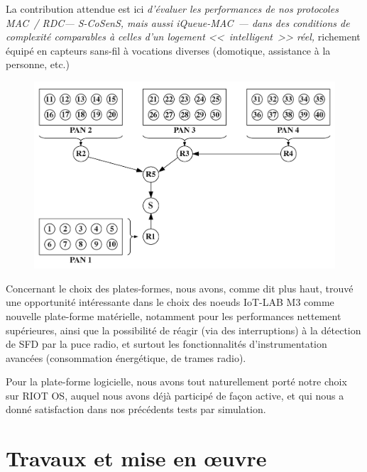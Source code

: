 \begin{enumerate}
La contribution attendue est ici \emph{d'évaluer les performances de nos
protocoles MAC~/ RDC--- S-CoSenS, mais aussi iQueue-MAC~--- dans des
conditions de complexité comparables à celles d'un logement <<~intelligent~>>
réel,} richement équipé en capteurs sans-fil à vocations diverses (domotique,
assistance à la personne, etc.)

\begin{figure}[!hbt]
\centering
\includegraphics[width=14cm]{images/ch6-config-test-2.png}
\label{FigTestConfig2}
\end{figure}

\end{enumerate}

Concernant le choix des plates-formes, nous avons, comme dit plus haut,
trouvé une opportunité intéressante dans le choix des noeuds IoT-LAB M3
comme nouvelle plate-forme matérielle, notamment pour les performances
nettement supérieures, ainsi que la possibilité de réagir (via des
interruptions) à la détection de SFD par la puce radio, et surtout les
fonctionnalités d'instrumentation avancées (consommation énergétique,
 de trames radio).

Pour la plate-forme logicielle, nous avons tout naturellement porté notre
choix sur RIOT OS, auquel nous avons déjà participé de façon active, et
qui nous a donné satisfaction dans nos précédents tests par simulation.


\section{Travaux et mise en {\oe}uvre}
\label{SecTravauxMiseOeuvre}


